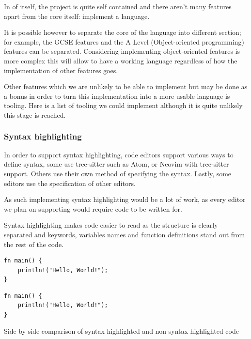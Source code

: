 \documentclass{article}
\begin{document}
In of itself, the project is quite self contained and there aren't many
features apart from the core itself: implement a language.

It is possible however to separate the core of the language into different
section; for example, the GCSE features and the A Level (Object-oriented
programming) features can be separated. Considering implementing
object-oriented features is more complex this will allow to have a working
language regardless of how the implementation of other features goes.

Other features which we are unlikely to be able to implement but may be done as
a bonus in order to turn this implementation into a more usable language is
tooling. Here is a list of tooling we could implement although it is quite
unlikely this stage is reached.

\subsubsection{Syntax highlighting}

In order to support syntax highlighting, code editors support various ways to
define syntax, some use tree-sitter such as Atom, or Neovim with tree-sitter
support. Others use their own method of specifying the syntax. Lastly, some
editors use the specification of other editors.

As such implementing syntax highlighting would be a lot of work, as every
editor we plan on supporting would require code to be written for.

Syntax highlighting makes code easier to read as the structure is clearly
separated and keywords, variables names and function definitions stand out from
the rest of the code.

\begin{listing}
	\centering
	\begin{minipage}{.5\textwidth}
		\centering
		\begin{verbatim}
fn main() {
    println!("Hello, World!");
}
		\end{verbatim}
	\end{minipage}%
	\begin{minipage}{.5\textwidth}
		\centering
		\begin{verbatim}
fn main() {
    println!("Hello, World!");
}
		\end{verbatim}
	\end{minipage}

	\caption{Side-by-side comparison of syntax highlighted and non-syntax
	highlighted code}
\end{listing}
\end{document}
